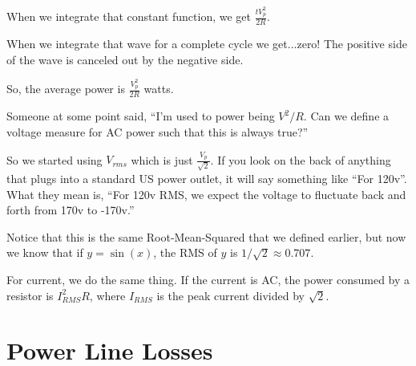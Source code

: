     
When we integrate that constant function, we get $\frac{t V_p^2}{2R}$.

When we integrate that wave for a complete cycle we get...zero! The
positive side of the wave is canceled out by the negative side.

So, the average power is $\frac{V_p^2}{2R}$ watts.

Someone at some point said, ``I'm used to power being $V^2/R$. Can
we define a voltage measure for AC power such that this is always true?''

So we started using $V_{rms}$ which is just
$\frac{V_p}{\sqrt{2}}$. If you look on the back of anything that plugs
into a standard US power outlet, it will say something like ``For
120v''.  What they mean is, ``For 120v RMS, we expect the voltage to
fluctuate back and forth from 170v to -170v.''

Notice that this is the same Root-Mean-Squared that we defined
earlier, but now we know that if $y = \sin(x)$, the RMS of $y$ is
$1/\sqrt{2} \approx 0.707$.

For current, we do the same thing. If the current is AC, the power
consumed by a resistor is $I_{RMS}^2 R$, where $I_{RMS}$ is the peak
current divided by $\sqrt{2}$.

\section{Power Line Losses}

